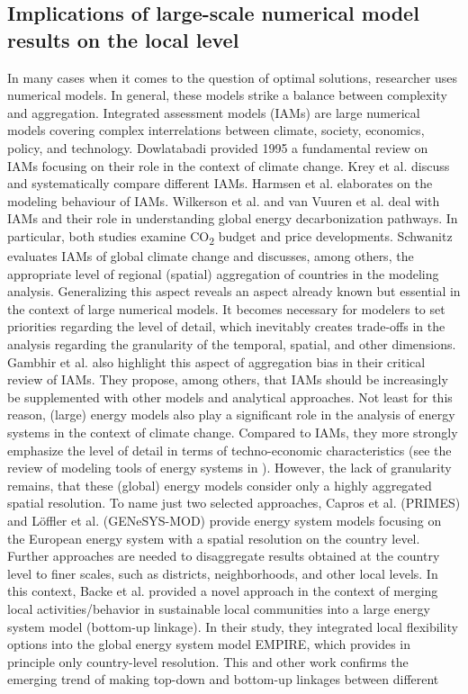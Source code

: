 \subsection{Implications of large-scale numerical model results on the local level}
In many cases when it comes to the question of optimal solutions, researcher uses numerical models. In general, these models strike a balance between complexity and aggregation. Integrated assessment models (IAMs) are large numerical models covering complex interrelations between climate, society, economics, policy, and technology. Dowlatabadi \cite{dowlatabadi1995integrated} provided 1995 a fundamental review on IAMs focusing on their role in the context of climate change. Krey et al. \cite{krey2019looking} discuss and systematically compare different IAMs. Harmsen et al. \cite{harmsen2021integrated} elaborates on the modeling behaviour of IAMs. Wilkerson et al. \cite{wilkerson2015comparison} and van Vuuren et al. \cite{van2016carbon} deal with IAMs and their role in understanding global energy decarbonization pathways. In particular, both studies examine CO\textsubscript{2} budget and price developments. Schwanitz \cite{schwanitz2013evaluating} evaluates IAMs of global climate change and discusses, among others, the appropriate level of regional (spatial) aggregation of countries in the modeling analysis. Generalizing this aspect reveals an aspect already known but essential in the context of large numerical models. It becomes necessary for modelers to set priorities regarding the level of detail, which inevitably creates trade-offs in the analysis regarding the granularity of the temporal, spatial, and other dimensions. Gambhir et al. \cite{gambhir2019review} also highlight this aspect of aggregation bias in their critical review of IAMs. They propose, among others, that IAMs should be increasingly be supplemented with other models and analytical approaches. Not least for this reason, (large) energy models also play a significant role in the analysis of energy systems in the context of climate change. Compared to IAMs, they more strongly emphasize the level of detail in terms of techno-economic characteristics (see the review of modeling tools of energy systems in \cite{ringkjob2018review}). However, the lack of granularity remains, that these (global) energy models consider only a highly aggregated spatial resolution. To name just two selected approaches, Capros et al. \cite{capros2012model} (PRIMES) and Löffler et al. \cite{loffler2017designing} (GENeSYS-MOD) provide energy system models focusing on the European energy system with a spatial resolution on the country level. Further approaches are needed to disaggregate results obtained at the country level to finer scales, such as districts, neighborhoods, and other local levels. In this context, Backe et al. \cite{backe2021heat} provided a novel approach in the context of merging local activities/behavior in sustainable local communities into a large energy system model (bottom-up linkage). In their study, they integrated local flexibility options into the global energy system model EMPIRE, which provides in principle only country-level resolution. This and other work confirms the emerging trend of making top-down and bottom-up linkages between different 